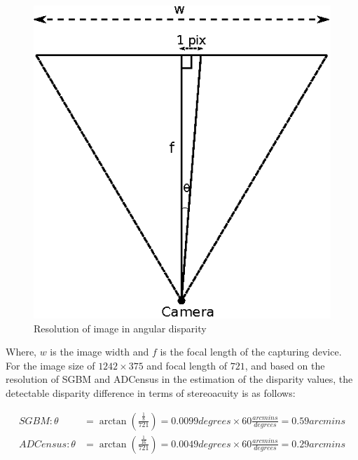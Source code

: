 \begin{figure}[H]
\centering
\includegraphics{camRes}
\caption{Resolution of image in angular disparity}
\label{fig:camResolution}
\end{figure}
\noindent
Where, $w$ is the image width and $f$ is the focal length of the capturing device.
For the image size of $1242\times375$ and focal length of $721$, and based on the resolution of SGBM and ADCensus in the estimation of the disparity values, 
the detectable disparity difference in terms of stereoacuity is as follows:

\begin{align}
\label{eq:algResolution}
SGBM: \theta &= \arctan (\frac{\frac{1}{8}}{721}) = 0.0099 degrees \times 60 \frac{arcmins}{degrees} = 0.59 arcmins \\
ADCensus: \theta &= \arctan (\frac{\frac{1}{16}}{721}) = 0.0049 degrees \times 60 \frac{arcmins}{degrees}= 0.29 arcmins
\end{align}
